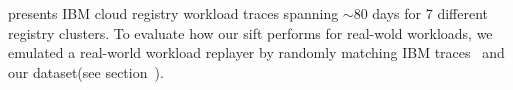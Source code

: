 \cite{xxx} presents IBM cloud registry workload traces spanning $\sim$80 days for 7 different registry clusters. 
To evaluate how our sift performs for real-wold workloads,
we emulated a real-world workload replayer by randomly matching IBM traces~\cite{xxx} and our dataset(see section~\cite{xxx}). 





